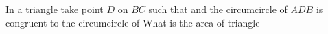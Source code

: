 In a triangle  take point $ D$ on $ BC$ such that  and the circumcircle of $ ADB$ is congruent to the circumcircle of   What is the area of triangle 